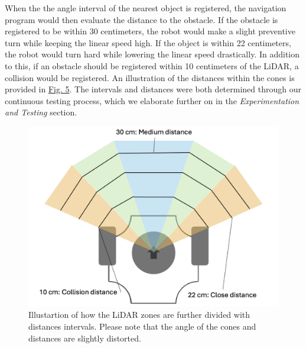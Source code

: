 \documentclass[conference]{IEEEtran}
\begin{document}
When the the angle interval of the nearest object is registered, the navigation program would then evaluate the distance to the obstacle.
If the obstacle is registered to be within 30 centimeters, the robot would make a slight preventive turn while keeping the linear speed high.
If the object is within 22 centimeters, the robot would turn hard while lowering the linear speed drastically.
In addition to this, if an obstacle should be registered within 10 centimeters of the LiDAR, a collision would be registered.
An illustration of the distances within the cones is provided in \href{sec:distances}{Fig. 5}.
The intervals and distances were both determined through our continuous testing process, which we elaborate further on in the \textit{Experimentation and Testing} section.
\begin{figure}[htbp]
    \centerline{\includegraphics[width=1.0\columnwidth]{Pictures/LiDAR Distances.png}}
    \caption{Illustartion of how the LiDAR zones are further divided with distances intervals. 
    Please note that the angle of the cones and distances are slightly distorted.}
    \label{sec:distances}
    \end{figure}
\end{document}
